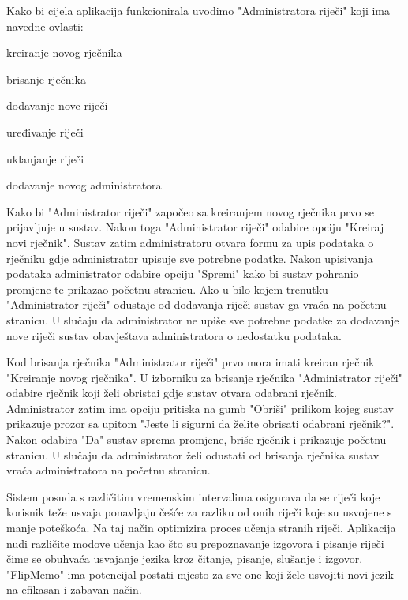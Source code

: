 Kako bi cijela aplikacija funkcionirala uvodimo "Administratora riječi" koji ima navedne ovlasti:

\begin{packed_item}
	\item  kreiranje novog rječnika
	\item  brisanje rječnika
	\item  dodavanje nove riječi
	\item  uređivanje riječi
	\item  uklanjanje riječi
	\item  dodavanje novog administratora
\end{packed_item}

Kako bi "Administrator riječi" započeo sa kreiranjem novog rječnika prvo se prijavljuje u sustav. Nakon toga "Administrator riječi" odabire opciju "Kreiraj novi rječnik". Sustav zatim administratoru otvara formu za upis podataka o rječniku gdje administrator upisuje sve potrebne podatke. Nakon upisivanja podataka administrator odabire opciju "Spremi" kako bi sustav pohranio promjene te prikazao početnu stranicu. Ako u bilo kojem trenutku "Administrator riječi" odustaje od dodavanja riječi sustav ga vraća na početnu stranicu. U slučaju da administrator ne upiše sve potrebne podatke za dodavanje nove riječi sustav obavještava administratora o nedostatku podataka.

Kod brisanja rječnika "Administrator riječi" prvo mora imati kreiran rječnik "Kreiranje novog rječnika". U izborniku za brisanje rječnika "Administrator riječi" odabire rječnik koji želi obristai gdje sustav otvara odabrani rječnik. Administrator zatim ima opciju pritiska na gumb "Obriši" prilikom kojeg sustav prikazuje prozor sa upitom "Jeste li sigurni da želite obrisati odabrani rječnik?". Nakon odabira "Da" sustav sprema promjene, briše rječnik i prikazuje početnu stranicu. U slučaju da administrator želi odustati od brisanja rječnika sustav vraća administratora na početnu stranicu. 

Sistem posuda s različitim vremenskim intervalima osigurava da se riječi koje korisnik teže usvaja ponavljaju češće za razliku od onih riječi koje su usvojene s manje poteškoća. Na taj način  optimizira proces učenja stranih riječi. Aplikacija nudi različite modove učenja kao što su prepoznavanje izgovora i pisanje riječi čime se obuhvaća usvajanje jezika kroz čitanje, pisanje, slušanje i izgovor. "FlipMemo" ima potencijal postati mjesto za sve one koji žele usvojiti novi jezik na efikasan i zabavan način.

